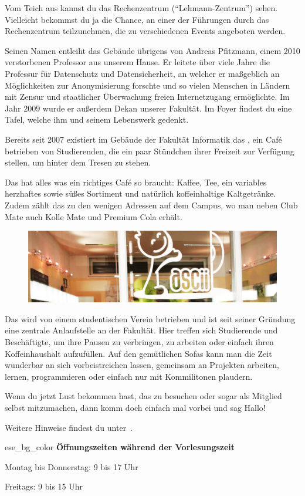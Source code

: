 Vom Teich aus kannst du das Rechenzentrum (\enquote{Lehmann-Zentrum}) sehen. Vielleicht bekommst du ja die Chance, an einer der Führungen durch das Rechenzentrum teilzunehmen, die zu verschiedenen Events angeboten werden.

Seinen Namen entleiht das Gebäude übrigens von Andreas Pfitzmann, einem 2010 verstorbenen Professor aus unserem Hause.
Er leitete über viele Jahre die Professur für Datenschutz und Datensicherheit, an welcher er maßgeblich an Möglichkeiten zur Anonymisierung forschte und so vielen Menschen in Ländern mit Zensur und staatlicher Überwachung freien Internetzugang ermöglichte. Im Jahr 2009 wurde er außerdem Dekan unserer Fakultät.
Im Foyer findest du eine Tafel, welche ihm und seinem Lebenswerk gedenkt.

\pagebreak


Bereits seit 2007 existiert im Gebäude der Fakultät Informatik das \ascii{}, ein Café betrieben von Studierenden, die ein paar Stündchen ihrer Freizeit zur Verfügung stellen, um hinter dem Tresen zu stehen.

Das \ascii{} hat alles was ein richtiges Café so braucht: Kaffee, Tee, ein variables herzhaftes sowie süßes Sortiment und natürlich koffeinhaltige Kaltgetränke.
Zudem zählt das \ascii{} zu den wenigen Adressen auf dem Campus, wo man neben Club Mate auch Kolle Mate und Premium Cola erhält.

\begin{figure}[h!]
    \centering
    \includegraphics[width=\linewidth]{img/ascii.jpg}
\end{figure}

Das \ascii{} wird von einem studentischen Verein betrieben und ist seit seiner Gründung eine zentrale Anlaufstelle an der Fakultät.
Hier treffen sich Studierende und Beschäftigte, um ihre Pausen zu verbringen, zu arbeiten oder einfach ihren Koffeinhaushalt aufzufüllen.
Auf den gemütlichen Sofas kann man die Zeit wunderbar an sich vorbeistreichen lassen, gemeinsam an Projekten arbeiten, lernen, programmieren oder einfach nur mit Kommilitonen plaudern.

Wenn du jetzt Lust bekommen hast, das \ascii{} zu besuchen oder sogar als Mitglied selbst mitzumachen, dann komm doch einfach mal vorbei und sag Hallo!

Weitere Hinweise findest du unter~.

\begin{awesomeblock}{2pt}{\faCalendar*[regular]}{ese_bg_color}
    \textbf{Öffnungszeiten während der Vorlesungszeit}

    Montag bis Donnerstag: 9 bis 17 Uhr

    Freitags: 9 bis 15 Uhr
\end{awesomeblock}
